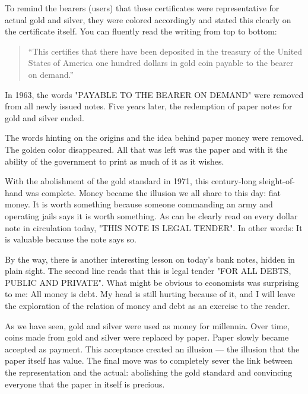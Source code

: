 To remind the bearers (users) that these certificates were
representative for actual gold and silver, they were colored accordingly
and stated this clearly on the certificate itself. You can fluently read
the writing from top to bottom:

\begin{quotation}
``This certifies that there have been deposited in the treasury of the
United States of America one hundred dollars in gold coin payable to
the bearer on demand.''
\end{quotation}


In 1963, the words "PAYABLE TO THE BEARER ON DEMAND" were removed from
all newly issued notes. Five years later, the redemption of paper notes
for gold and silver ended.

The words hinting on the origins and the idea behind paper money were
removed. The golden color disappeared. All that was left was the paper
and with it the ability of the government to print as much of it as it
wishes.

With the abolishment of the gold standard in 1971, this century-long
sleight-of-hand was complete. Money became the illusion we all share to
this day: fiat money. It is worth something because someone commanding
an army and operating jails says it is worth something. As can be
clearly read on every dollar note in circulation today, "THIS NOTE IS
LEGAL TENDER". In other words: It is valuable because the note says so.


By the way, there is another interesting lesson on today's bank notes,
hidden in plain sight. The second line reads that this is legal tender
"FOR ALL DEBTS, PUBLIC AND PRIVATE". What might be obvious to economists
was surprising to me: All money is debt. My head is still hurting
because of it, and I will leave the exploration of the relation of money
and debt as an exercise to the reader.

As we have seen, gold and silver were used as money for millennia. Over
time, coins made from gold and silver were replaced by paper. Paper
slowly became accepted as payment. This acceptance created an
illusion --- the illusion that the paper itself has value. The final
move was to completely sever the link between the representation and the
actual: abolishing the gold standard and convincing everyone that the
paper in itself is precious.

